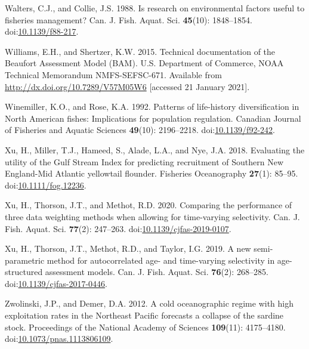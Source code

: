 \documentclass[]{article}
\begin{document}
\leavevmode\hypertarget{ref-walters1988Research}{}%
Walters, C.J., and Collie, J.S. 1988. Is research on environmental
factors useful to fisheries management? Can. J. Fish. Aquat. Sci.
\textbf{45}(10): 1848--1854.
doi:\href{https://doi.org/10.1139/f88-217}{10.1139/f88-217}.

\leavevmode\hypertarget{ref-williams2015Technical}{}%
Williams, E.H., and Shertzer, K.W. 2015. Technical documentation of the
Beaufort Assessment Model (BAM). U.S. Department of Commerce, NOAA
Technical Memorandum NMFS-SEFSC-671. Available from
\url{http://dx.doi.org/10.7289/V57M05W6} {[}accessed 21 January 2021{]}.

\leavevmode\hypertarget{ref-winemiller1992Patterns}{}%
Winemiller, K.O., and Rose, K.A. 1992. Patterns of life-history
diversification in North American fishes: Implications for population
regulation. Canadian Journal of Fisheries and Aquatic Sciences
\textbf{49}(10): 2196--2218.
doi:\href{https://doi.org/10.1139/f92-242}{10.1139/f92-242}.

\leavevmode\hypertarget{ref-xu2018Evaluating}{}%
Xu, H., Miller, T.J., Hameed, S., Alade, L.A., and Nye, J.A. 2018.
Evaluating the utility of the Gulf Stream Index for predicting
recruitment of Southern New England-Mid Atlantic yellowtail flounder.
Fisheries Oceanography \textbf{27}(1): 85--95.
doi:\href{https://doi.org/10.1111/fog.12236}{10.1111/fog.12236}.

\leavevmode\hypertarget{ref-xu2020Comparing}{}%
Xu, H., Thorson, J.T., and Methot, R.D. 2020. Comparing the performance
of three data weighting methods when allowing for time-varying
selectivity. Can. J. Fish. Aquat. Sci. \textbf{77}(2): 247--263.
doi:\href{https://doi.org/10.1139/cjfas-2019-0107}{10.1139/cjfas-2019-0107}.

\leavevmode\hypertarget{ref-xu2019New}{}%
Xu, H., Thorson, J.T., Methot, R.D., and Taylor, I.G. 2019. A new
semi-parametric method for autocorrelated age- and time-varying
selectivity in age-structured assessment models. Can. J. Fish. Aquat.
Sci. \textbf{76}(2): 268--285.
doi:\href{https://doi.org/10.1139/cjfas-2017-0446}{10.1139/cjfas-2017-0446}.

\leavevmode\hypertarget{ref-zwolinski2012Cold}{}%
Zwolinski, J.P., and Demer, D.A. 2012. A cold oceanographic regime with
high exploitation rates in the Northeast Pacific forecasts a collapse of
the sardine stock. Proceedings of the National Academy of Sciences
\textbf{109}(11): 4175--4180.
doi:\href{https://doi.org/10.1073/pnas.1113806109}{10.1073/pnas.1113806109}.
\end{document}
